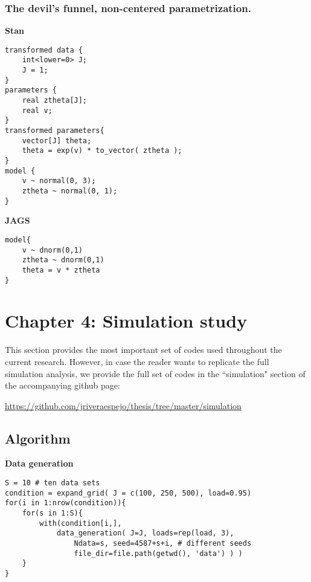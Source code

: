 
\subsubsection{The devil's funnel, non-centered parametrization.}

\noindent \textbf{Stan}
%
\begin{lstlisting}
transformed data {
	int<lower=0> J;
	J = 1;
}
parameters {
	real ztheta[J];
	real v;
}
transformed parameters{
	vector[J] theta;
	theta = exp(v) * to_vector( ztheta );
}
model {
	v ~ normal(0, 3);
	ztheta ~ normal(0, 1);
}
\end{lstlisting}


\noindent \textbf{JAGS}
%
\begin{lstlisting}
model{
	v ~ dnorm(0,1)
	ztheta ~ dnorm(0,1)
	theta = v * ztheta
}
\end{lstlisting}



\newpage
\section{Chapter 4: Simulation study} \label{appC2:chapter4}

This section provides the most important set of codes used throughout the current research. However, in case the reader wants to replicate the full simulation analysis, we provide the full set of codes in the ``simulation" section of the accompanying github page:

\noindent \url{https://github.com/jriveraespejo/thesis/tree/master/simulation} \\

\subsection{Algorithm} \label{appC2_1:sim}

\noindent \textbf{Data generation}
%
\begin{lstlisting}
S = 10 # ten data sets
condition = expand_grid( J = c(100, 250, 500), load=0.95)
for(i in 1:nrow(condition)){
	for(s in 1:S){
		with(condition[i,],
			data_generation( J=J, loads=rep(load, 3), 
				Ndata=s, seed=4587+s+i, # different seeds
				file_dir=file.path(getwd(), 'data') ) )
	}
}
\end{lstlisting}

